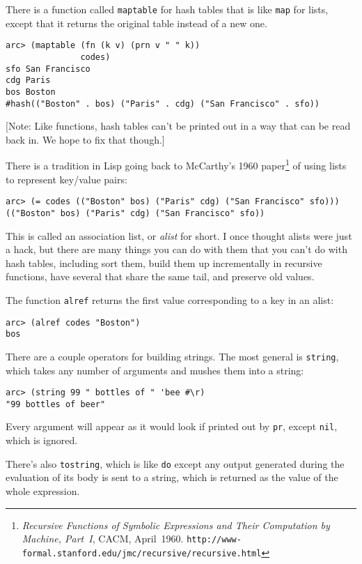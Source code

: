 \documentclass[a4paper,12pt]{book}
\begin{document}
There is a function called \verb|maptable| for hash tables that is like
\verb|map| for lists, except that it returns the original table instead
of a new one.

\begin{verbatim}
arc> (maptable (fn (k v) (prn v " " k))
               codes)
sfo San Francisco
cdg Paris
bos Boston
#hash(("Boston" . bos) ("Paris" . cdg) ("San Francisco" . sfo))
\end{verbatim}

[Note: Like functions, hash tables can't be printed out in a way
that can be read back in.  We hope to fix that though.]

There is a tradition in {\sc{}Lisp} going back to McCarthy's 1960 paper\footnote{%
{\em Recursive Functions of Symbolic Expressions and Their Computation
by Machine, Part~I}, CACM, April~1960.
{\tt{}http://www-formal.stanford.edu/jmc/recursive/recursive.html}
}
of using lists to represent key/value pairs:

\begin{verbatim}
arc> (= codes (("Boston" bos) ("Paris" cdg) ("San Francisco" sfo)))
(("Boston" bos) ("Paris" cdg) ("San Francisco" sfo))
\end{verbatim}

This is called an association list, or {\em{}alist} for short.  I once
thought alists were just a hack, but there are many things you can
do with them that you can't do with hash tables, including sort
them, build them up incrementally in recursive functions, have
several that share the same tail, and preserve old values.

The function \verb|alref| returns the first value corresponding to a key
in an alist:

\begin{verbatim}
arc> (alref codes "Boston")
bos
\end{verbatim}

There are a couple operators for building strings.  The most general
is \verb|string|, which takes any number of arguments and mushes them into
a string:

\begin{verbatim}
arc> (string 99 " bottles of " 'bee #\r)
"99 bottles of beer"
\end{verbatim}

Every argument will appear as it would look if printed out by \verb|pr|,
except \verb|nil|, which is ignored.

There's also \verb|tostring|, which is like \verb|do| except any output generated
during the evaluation of its body is sent to a string, which is
returned as the value of the whole expression.
\end{document}
